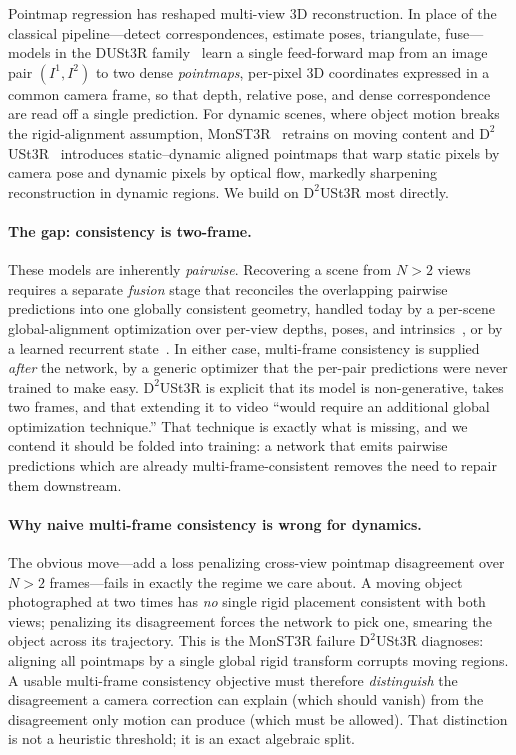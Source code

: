 \documentclass{article}
\theoremstyle{definition}
\theoremstyle{plain}
\theoremstyle{remark}
\begin{document}
Pointmap regression has reshaped multi-view 3D reconstruction. In place
of the classical pipeline---detect correspondences, estimate poses,
triangulate, fuse---models in the DUSt3R
family~\citep{wang2024dust3r,leroy2024grounding} learn a single
feed-forward map from an image pair $(I^1,I^2)$ to two dense
\emph{pointmaps}, per-pixel 3D coordinates expressed in a common camera
frame, so that depth, relative pose, and dense correspondence are read off
a single prediction. For dynamic scenes, where object motion breaks the
rigid-alignment assumption, MonST3R~\citep{zhang2025monst3r} retrains on
moving content and $\mathrm{D}^2$USt3R~\citep{han2026enhancing} introduces
static--dynamic aligned pointmaps that warp static pixels by camera pose
and dynamic pixels by optical flow, markedly sharpening reconstruction in
dynamic regions. We build on $\mathrm{D}^2$USt3R most directly.

\paragraph{The gap: consistency is two-frame.}
These models are inherently \emph{pairwise}. Recovering a scene from
$N>2$ views requires a separate \emph{fusion} stage that reconciles the
overlapping pairwise predictions into one globally consistent geometry,
handled today by a per-scene global-alignment optimization over per-view
depths, poses, and intrinsics~\citep{wang2024dust3r,zhang2025monst3r}, or
by a learned recurrent state~\citep{wang2025continuous,wang20253d}. In
either case, multi-frame consistency is supplied \emph{after} the
network, by a generic optimizer that the per-pair predictions were never
trained to make easy. $\mathrm{D}^2$USt3R is explicit that its model is
non-generative, takes two frames, and that extending it to video ``would
require an additional global optimization technique.'' That technique is
exactly what is missing, and we contend it should be folded into training:
a network that emits pairwise predictions which are already
multi-frame-consistent removes the need to repair them downstream.

\paragraph{Why naive multi-frame consistency is wrong for dynamics.}
The obvious move---add a loss penalizing cross-view pointmap disagreement
over $N>2$ frames---fails in exactly the regime we care about. A moving
object photographed at two times has \emph{no} single rigid placement
consistent with both views; penalizing its disagreement forces the
network to pick one, smearing the object across its trajectory. This is
the MonST3R failure $\mathrm{D}^2$USt3R diagnoses: aligning all pointmaps
by a single global rigid transform corrupts moving regions. A usable
multi-frame consistency objective must therefore \emph{distinguish} the
disagreement a camera correction can explain (which should vanish) from
the disagreement only motion can produce (which must be allowed). That
distinction is not a heuristic threshold; it is an exact algebraic split.
\end{document}
